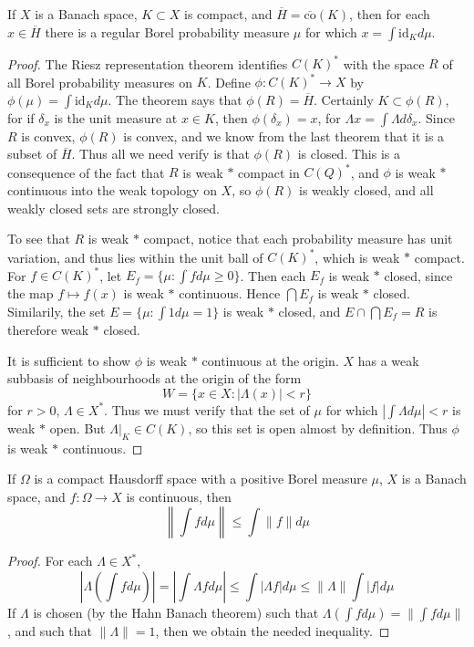 \begin{theorem}
    If $X$ is a Banach space, $K \subset X$ is compact, and $\overline{H} = \overline{\text{co}}(K)$, then for each $x \in \overline{H}$ there is a regular Borel probability measure $\mu$ for which $x = \int \text{id}_K d\mu$.
\end{theorem}
\begin{proof}
    The Riesz representation theorem identifies $C(K)^*$ with the space $R$ of all Borel probability measures on $K$. Define $\phi: C(K)^* \to X$ by $\phi(\mu) = \int \text{id}_K d\mu$. The theorem says that $\phi(R) = \overline{H}$. Certainly $K \subset \phi(R)$, for if $\delta_x$ is the unit measure at $x \in K$, then $\phi(\delta_x) = x$, for $\Lambda x = \int \Lambda d \delta_x$. Since $R$ is convex, $\phi(R)$ is convex, and we know from the last theorem that it is a subset of $\overline{H}$. Thus all we need verify is that $\phi(R)$ is closed. This is a consequence of the fact that $R$ is weak $*$ compact in $C(Q)^*$, and $\phi$ is weak $*$ continuous into the weak topology on $X$, so $\phi(R)$ is weakly closed, and all weakly closed sets are strongly closed.

    To see that $R$ is weak $*$ compact, notice that each probability measure has unit variation, and thus lies within the unit ball of $C(K)^*$, which is weak $*$ compact. For $f \in C(K)^*$, let $E_f = \{ \mu : \int f d\mu \geq 0 \}$. Then each $E_f$ is weak $*$ closed, since the map $f \mapsto f(x)$ is weak $*$ continuous. Hence $\bigcap E_f$ is weak $*$ closed. Similarily, the set $E = \{ \mu : \int 1 d\mu = 1 \}$ is weak $*$ closed, and $E \cap \bigcap E_f = R$ is therefore weak $*$ closed.

    It is sufficient to show $\phi$ is weak $*$ continuous at the origin. $X$ has a weak subbasis of neighbourhoods at the origin of the form
    \[ W = \{ x \in X : |\Lambda(x)| < r \} \]
    for $r > 0$, $\Lambda \in X^*$. Thus we must verify that the set of $\mu$ for which $\left| \int \Lambda d\mu \right| < r$ is weak $*$ open. But $\Lambda|_K \in C(K)$, so this set is open almost by definition. Thus $\phi$ is weak $*$ continuous.
\end{proof}

\begin{theorem}
    If $\Omega$ is a compact Hausdorff space with a positive Borel measure $\mu$, $X$ is a Banach space, and $f: \Omega \to X$ is continuous, then
    \[ \left\| \int f d\mu \right\| \leq \int \| f \| d\mu \]
\end{theorem}
\begin{proof}
    For each $\Lambda \in X^*$,
    \[ \left| \Lambda\left(\int f d\mu\right) \right| = \left| \int \Lambda f d\mu \right| \leq \int | \Lambda f | d\mu \leq \| \Lambda \| \int | f | d\mu \]
    If $\Lambda$ is chosen (by the Hahn Banach theorem) such that $\Lambda(\int f d\mu) = \| \int f d\mu \|$, and such that $\| \Lambda \| = 1$, then we obtain the needed inequality.
\end{proof}

